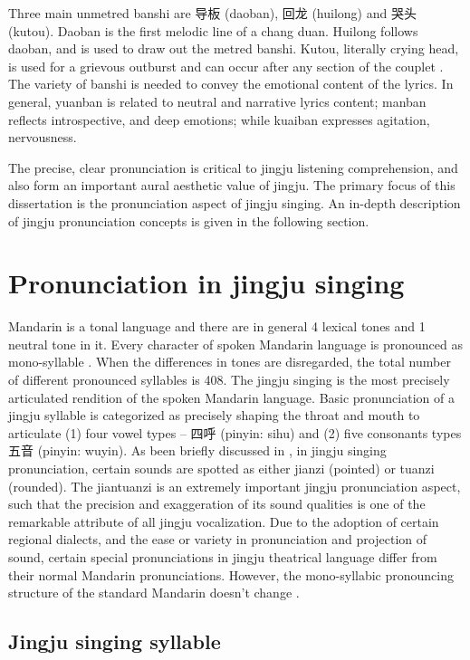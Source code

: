 Three main unmetred banshi are 导板 (daoban), 回龙 (huilong) and 哭头 (kutou). Daoban is the first melodic line of a chang duan. Huilong follows daoban, and is used to draw out the metred banshi. Kutou, literally crying head, is used for a grievous outburst and can occur after any section of the couplet \cite{Repetto2018}. The variety of banshi is needed to convey the emotional content of the lyrics. In general, yuanban is related to neutral and narrative lyrics content; manban reflects introspective, and deep emotions; while kuaiban expresses agitation, nervousness.

The precise, clear pronunciation is critical to jingju listening comprehension, and also form an important aural aesthetic value of jingju. The primary focus of this dissertation is the pronunciation aspect of jingju singing. An in-depth description of jingju pronunciation concepts is given in the following section.

\section{Pronunciation in jingju singing}

Mandarin is a tonal language and there are in general 4 lexical tones and 1 neutral tone in it. Every character of spoken Mandarin language is pronounced as mono-syllable \cite{lin_new_1993}. When the differences in tones are disregarded, the total number of different pronounced syllables is 408. The jingju singing is the most precisely articulated rendition of the spoken Mandarin language. Basic pronunciation of a jingju syllable is categorized as precisely shaping the throat and mouth to articulate (1) four vowel types -- 四呼 (pinyin: sihu) and (2) five consonants types 五音 (pinyin: wuyin). As been briefly discussed in , in jingju singing pronunciation, certain sounds are spotted as either jianzi (pointed) or tuanzi (rounded). The jiantuanzi is an extremely important jingju pronunciation aspect, such that the precision and exaggeration of its sound qualities is one of the remarkable attribute of all jingju vocalization. Due to the adoption of certain regional dialects, and the ease or variety in pronunciation and projection of sound, certain special pronunciations in jingju theatrical language differ from their normal Mandarin pronunciations. However, the mono-syllabic pronouncing structure of the standard Mandarin doesn't change \cite{Wichmann1991a}. 

\subsection{Jingju singing syllable}

